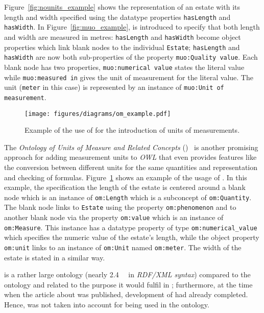 Figure~\ref{fig:nounits_example} shows the representation of an estate with its length and width specified using the datatype properties \texttt{hasLength} and \texttt{hasWidth}. In Figure~\ref{fig:muo_example}, \muo is introduced to specify that both length and width are measured in metres: \texttt{hasLength} and \texttt{hasWidth} become object properties which link blank nodes to the individual \texttt{Estate}; \texttt{hasLength} and \texttt{hasWidth} are now both sub-properties of the property \texttt{muo:Quality value}. Each blank node has two properties, \texttt{muo:numerical value} states the literal value while \texttt{muo:measured in} gives the unit of measurement for the literal value. The unit (\texttt{meter} in this case) is represented by an instance of \texttt{muo:Unit of measurement}.

\begin{figure}
\centering
\texttt{[image: figures/diagrams/om\_example.pdf]}
\caption[Example of the use of ]{Example of the use of  for the introduction of units of measurements.}
\label{fig:om_example}
\end{figure}

The \emph{Ontology of Units of Measure and Related Concepts} ()~\cite{OMWeb,OM} is another promising approach for adding measurement units to \emph{OWL} that even provides features like the conversion between different units for the same quantities and representation and checking of formulas. Figure~\ref{fig:om_example} shows an example of the usage of . In this example, the specification the length of the estate is centered around a blank node which is an instance of \texttt{om:Length} which is a subconcept of \texttt{om:Quantity}. The blank node links to \texttt{Estate} using the property \texttt{om:phenomenon} and to another blank node via the property \texttt{om:value} which is an instance of \texttt{om:Measure}. This instance has a datatype property of type \texttt{om:numerical\_value} which specifies the numeric value of the estate's length, while the object property \texttt{om:unit}
links to an instance of \texttt{om:Unit} named \texttt{om:meter}. The width of the estate is stated in a similar way.

 is a rather large ontology (nearly \SI{2.4}{\mebi\byte} in \emph{RDF/XML syntax}) compared to the \smarthomeweather ontology and related to the purpose it would fulfil in \smarthomeweather; furthermore, at the time when the article about  was published, development of \smarthomeweather had already completed. Hence,  was not taken into account for being used in the \smarthomeweather ontology.

